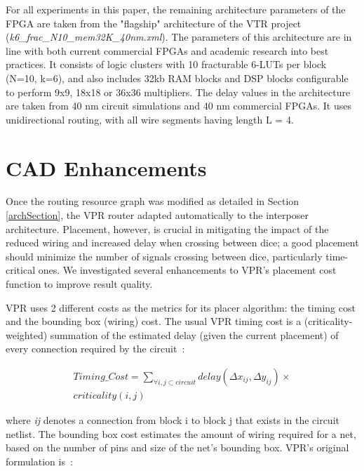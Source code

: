 \documentclass{sig-alternate-2013}
\begin{document}
For all experiments in this paper, the remaining architecture parameters of the FPGA are taken from the "flagship" architecture of the VTR project (\textit{k6\_frac\_N10\_mem32K\_40nm.xml}). The parameters of this architecture are in line with both current commercial FPGAs and academic research into best practices. It consists of logic clusters with 10 fracturable 6-LUTs per block (N=10, k=6), and also includes 32kb RAM blocks and DSP blocks configurable to perform 9x9, 18x18 or 36x36 multipliers. The delay values in the architecture are taken from 40 nm circuit simulations and 40 nm commercial FPGAs. It uses unidirectional routing, with all wire segments having length L = 4.

\section{CAD Enhancements}
\label{cadSection}

Once the routing resource graph was modified as detailed in Section \ref{archSection}, the VPR router adapted automatically to the interposer architecture. Placement, however, is crucial in mitigating the impact of the reduced wiring and increased delay when crossing between dice; a good placement should minimize the number of signals crossing between dice, particularly time-critical ones. We investigated several enhancements to VPR's placement cost function to improve result quality. 

VPR uses 2 different costs as the metrics for its placer algorithm: the timing cost and the bounding box (wiring) cost. The usual VPR timing cost is a (criticality-weighted) summation of the estimated delay (given the current placement) of every connection required by the circuit~\cite{timing2000}:

\begin{equation} \label{eq:timing_eq_full}
\begin{split}
Timing\_Cost = \sum_{\forall i, j \subset circuit} delay(\Delta x_{ij},\Delta y_{ij}) \times \\ 
criticality(i,j)
\end{split}
\end{equation}

where \textit{ij} denotes a connection from block i to block j that exists in the circuit netlist.
The bounding box cost estimates the amount of wiring required for a net, based on the number of pins and size of the net's bounding box. VPR's original formulation is~\cite{betz1997vpr}:
\end{document}
